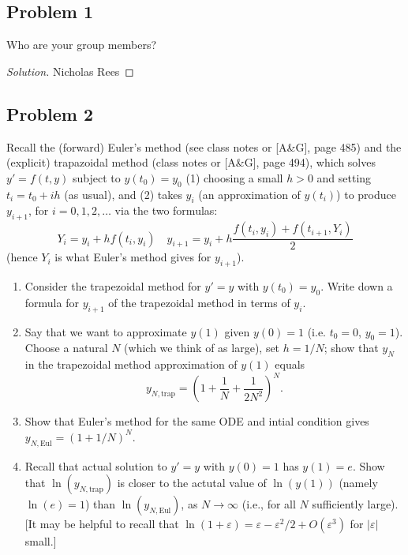\documentclass{article}
\newcommand{\ep}{{\varepsilon}}
\begin{document}
\subsection*{Problem 1}
Who are your group members?
\begin{proof}[Solution]\let\qed\relax
	Nicholas Rees
\end{proof}


\subsection*{Problem 2}
Recall the (forward) Euler's method (see class notes or [A\&G], page 485)
and the (explicit) trapazoidal method (class notes or [A\&G], page 494),
which solves $y' = f(t,y)$ subject to $y(t_0) = y_0$
(1) choosing a small $h > 0$ and setting $t_i = t_0 + ih$ (as usual),
and (2) takes $y_i$ (an approximation of $y(t_i)$) to produce $y_{i+1}$,
for $i = 0, 1, 2, \dots$ via the two formulas:
\[
	Y_i = y_i + hf(t_i,y_i) \quad y_{i+1} = y_i + h\frac{f(t_i,y_i)+f(t_{i+1},Y_i)}{2}
\]
(hence $Y_i$ is what Euler's method gives for $y_{i+1}$).
\begin{enumerate}
	\item Consider the trapezoidal method for $y' = y$ with $y(t_0) = y_0$.
		Write down a formula for $y_{i+1}$ of the trapezoidal method in terms of $y_i$.
	\item Say that we want to approximate $y(1)$ given $y(0) = 1$
		(i.e. $t_0 = 0$, $y_0 = 1$).
		Choose a natural $N$ (which we think of as large), set $h = 1/N$;
		show that $y_N$ in the trapezoidal method approximation of $y(1)$ equals
		\[
			y_{N,\text{trap}} = \left(1 + \frac{1}{N} + \frac{1}{2N^2}\right)^N.
		\]
	\item Show that Euler's method for the same ODE and intial condition
		gives $y_{N,\text{Eul}} = (1+1/N)^N$.
	\item Recall that actual solution to $y' = y$ with $y(0) = 1$ has $y(1) = e$.
		Show that $\ln(y_{N,\text{trap}})$ is closer to the
		actutal value of $\ln(y(1))$ (namely $\ln(e) = 1$)
		than $\ln(y_{N,\text{Eul}})$, as $N \to \infty$
		(i.e., for all $N$ sufficiently large).
		[It may be helpful to recall that $\ln(1+\ep) = \ep - \ep^2/2 + O(\ep^3)$
		for $|\ep|$ small.]
\end{enumerate}
\end{document}

